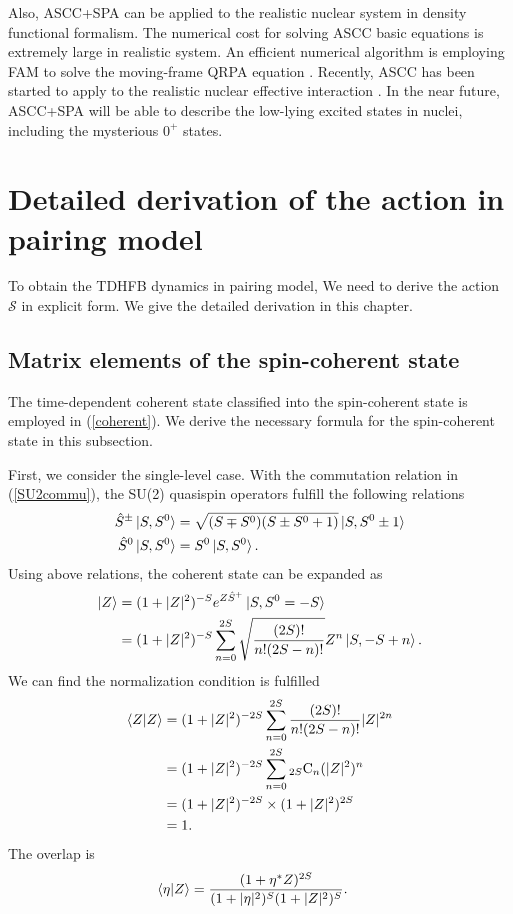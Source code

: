 \documentclass[11pt]{book} %
\begin{document}
Also, ASCC+SPA can be applied to the realistic nuclear system in density functional formalism. The numerical cost for solving ASCC basic equations is extremely large in realistic system. An efficient numerical algorithm is employing FAM to solve the moving-frame QRPA equation \cite{NIY07,HKN13}. Recently, ASCC has been started to apply to the realistic nuclear effective interaction \cite{WN16,WN17}. In the near future, ASCC+SPA will be able to describe the low-lying excited states in nuclei, including the mysterious $0^+$ states.



\clearpage{\pagestyle{empty}\cleardoublepage}
\appendix

\chapter{Detailed derivation of the action in pairing model}
\label{derivation}
To obtain the TDHFB dynamics in pairing model, We need to derive the action $\mathcal{S}$ in explicit form. We give the detailed derivation in this chapter.

\section{Matrix elements of the spin-coherent state}
\label{formula1}
The time-dependent coherent state classified into the spin-coherent state is employed in (\ref{coherent}). We derive the necessary formula for the spin-coherent state in this subsection. \par
First, we consider the single-level case.
With the commutation relation in (\ref{SU2commu}), the SU(2) quasispin operators fulfill the following relations
\begin{align}
  \hat{S}^{\pm}\ket{S,S^0} &= \sqrt{(S\mp S^0)(S\pm S^0+1)} \ket{S,S^0\pm 1}
  \label{S_pm} \\
  \hat{S}^0\ket{S,S^0} &= S^0\ket{S,S^0} .
\end{align}
Using above relations, the coherent state can be expanded as 
\begin{align}
  \ket{Z} &= (1+|Z|^2)^{-S}e^{Z \hat{S}^+}\ket{S,S^0=-S} \nonumber \\
  &= (1+|Z|^2)^{-S}\sum_{n=0}^{2S}\sqrt{\frac{(2S)!}{n!(2S-n)!}}Z^n\ket{S,-S+n} .
\end{align}
We can find the normalization condition is fulfilled
\begin{align}
  \braket{Z|Z} &= (1+|Z|^2)^{-2S}\sum_{n=0}^{2S}\frac{(2S)!}{n!(2S-n)!}|Z|^{2n} \nonumber \\
  &= (1+|Z|^2)^{-2S}\sum_{n=0}^{2S} {}_{2S}\mathrm{C}_n(|Z|^2)^n \nonumber \\
  &= (1+|Z|^2)^{-2S}\times(1+|Z|^2)^{2S} \nonumber \\
  &= 1 .
\end{align}
The overlap is
\begin{align}
  \braket{\eta|Z} &= \frac{(1+\eta^*Z)^{2S}}{(1+|\eta|^2)^S(1+|Z|^2)^S} .
\end{align}
\end{document}
